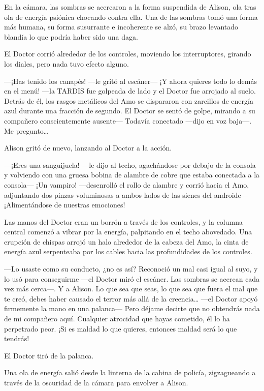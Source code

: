 {En la cámara, las sombras
 se acercaron a la forma suspendida de Alison, ola tras ola de energía
 psiónica chocando contra ella. Una de las sombras tomó una forma más
 humana, su forma susurrante e incoherente se alzó, su brazo levantado
blandía lo que podría haber sido una daga.}

{El Doctor corrió alrededor de los controles, moviendo los interruptores,
girando los diales, pero nada tuvo efecto alguno.}

{---¡Has tenido los canapés! ---le gritó al escáner--- ¡Y ahora quieres
 todo lo demás en el menú! ---la TARDIS fue golpeada de lado y el Doctor
 fue arrojado al suelo. Detrás de él, los rasgos metálicos del Amo se
 dispararon con zarcillos de energía azul durante una fracción de
 segundo. El Doctor se sentó de golpe, mirando a su compañero
 conscientemente ausente--- Todavía conectado ---dijo en voz baja---. Me
 pregunto\ldots{}}

{Alison gritó de nuevo, lanzando al Doctor a la acción.}

{---¡Eres una sanguijuela! ---le dijo al techo, agachándose por debajo de
 la consola y volviendo con una gruesa bobina de alambre de cobre que
 estaba conectada a la consola--- ¡Un vampiro! ---desenrolló el rollo de
 alambre y corrió hacia el Amo, adjuntando dos pinzas voluminosas a ambos
 lados de las sienes del androide--- ¡Alimentándose de nuestras
emociones!}

{Las manos del Doctor eran un borrón a través de los controles, y la
 columna central comenzó a vibrar por la energía, palpitando en el techo
 abovedado. Una erupción de chispas arrojó un halo alrededor de la cabeza
 del Amo, la cinta de energía azul serpenteaba por los cables hacia las
profundidades de los controles.}

{---Lo usaste como su conducto, ¿no es así? Reconoció un mal casi igual
 al suyo, y lo usó para conseguirme ---el Doctor miró el escáner. Las
 sombras se acercan cada vez más cerca---. Y a Alison. Lo que sea que
 seas, lo que sea que fuera el mal que te creó, debes haber causado el
 terror más allá de la creencia\ldots{} ---el Doctor apoyó firmemente la
 mano en una palanca--- Pero déjame decirte que no obtendrás nada de mi
 compañero aquí. Cualquier atrocidad que hayas cometido, él lo ha
 perpetrado peor. ¡Si es maldad lo que quieres, entonces maldad será lo
que tendrás!}

{El Doctor tiró de la palanca.}

{Una ola de energía salió desde la linterna de la cabina de policía,
 zigzagueando a través de la oscuridad de la cámara para envolver a
Alison.}

